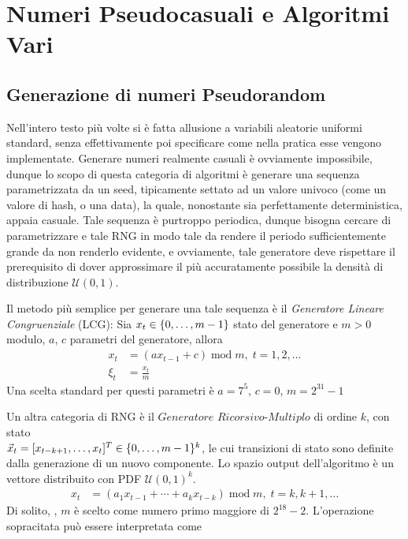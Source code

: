 \chapter{Numeri Pseudocasuali e Algoritmi Vari}\label{appendixC}
\section{Generazione di numeri Pseudorandom}\label{appendixC:RNG}
Nell'intero testo pi\`u volte si \`e fatta allusione a variabili aleatorie uniformi standard, senza effettivamente poi specificare come nella 
pratica esse vengono implementate. Generare numeri realmente casuali \`e ovviamente impossibile, dunque lo scopo di questa categoria di algoritmi 
\`e generare una sequenza parametrizzata da un seed, tipicamente settato ad un valore univoco (come un valore di hash, o una data), la quale,
nonostante sia perfettamente deterministica, appaia casuale. Tale sequenza \`e purtroppo periodica, dunque bisogna cercare di parametrizzare e 
tale RNG in modo tale da rendere il periodo sufficientemente grande da non renderlo evidente, e ovviamente, tale generatore deve rispettare 
il prerequisito di dover approssimare il pi\`u accuratamente possibile la densit\`a di distribuzione $\mathcal{U}(0,1)$.\par
Il metodo pi\`u semplice per generare una tale sequenza \`e il \textit{Generatore Lineare Congruenziale} (LCG): 
Sia $\mathmakebox{x_t}\in\{0,\ldots,m-1\}$
stato del generatore e $m>0$ modulo, $a$, $c$ parametri del generatore, allora
\begin{align}
	x_t&=(ax_{t-1}+c)\operatorname{mod}m,\;t=1,2,\ldots\\
	\xi_t&=\frac{x_t}{m}\nonumber
\end{align}
Una scelta standard per questi parametri \cite{dirk} \`e $a=7^5$, $c=0$, $m=2^{31}-1$\par
Un altra categoria di RNG \`e il $\textit{Generatore Ricorsivo-Multiplo}$ di ordine\footnotemark{} $k$, con stato 
\\$\mathmakebox{\vec{x}_t=[x_{t-k+1},\ldots,x_t]^T\in\{0,\ldots,m-1\}^k}$, le cui transizioni di stato sono definite dalla generazione di un nuovo 
componente. Lo spazio output dell'algoritmo \`e un vettore distribuito con PDF $\mathcal{U}(0,1)^k$.
\begin{align}
	x_t&=(a_1x_{t-1}+\cdots+a_kx_{t-k})\operatorname{mod}m,\;t=k,k+1,\ldots
\end{align}
Di solito, \cite{dirk}, $m$ \`e scelto come numero primo maggiore di $2^{18}-2$. L'operazione sopracitata pu\`o essere interpretata come 
